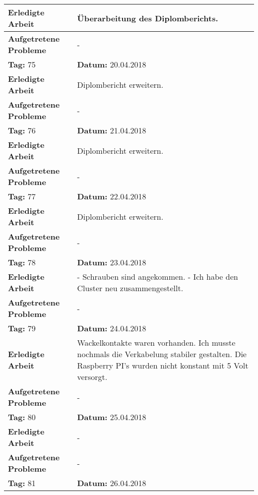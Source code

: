 \begin{longtable}{|p{5cm}|p{5cm}p{6cm}|}
\textbf{Erledigte Arbeit} & \multicolumn{2}{p{11cm}|}{Überarbeitung des Diplomberichts.} \\ \hline
\textbf{Aufgetretene Probleme} & \multicolumn{2}{p{11cm}|}{-} \\ \hline
\rowcolor{heading}\textbf{Tag:} 75 & \textbf{Datum:} 20.04.2018 & \\ \hline
\textbf{Erledigte Arbeit} & \multicolumn{2}{p{11cm}|}{Diplombericht erweitern.} \\ \hline
\textbf{Aufgetretene Probleme} & \multicolumn{2}{p{11cm}|}{-} \\ \hline
\rowcolor{heading}\textbf{Tag:} 76 & \textbf{Datum:} 21.04.2018 & \\ \hline
\textbf{Erledigte Arbeit} & \multicolumn{2}{p{11cm}|}{Diplombericht erweitern.} \\ \hline
\textbf{Aufgetretene Probleme} & \multicolumn{2}{p{11cm}|}{-} \\ \hline
\rowcolor{heading}\textbf{Tag:} 77 & \textbf{Datum:} 22.04.2018 & \\ \hline
\textbf{Erledigte Arbeit} & \multicolumn{2}{p{11cm}|}{Diplombericht erweitern.} \\ \hline
\textbf{Aufgetretene Probleme} & \multicolumn{2}{p{11cm}|}{-} \\ \hline
\rowcolor{heading}\textbf{Tag:} 78 & \textbf{Datum:} 23.04.2018 & \\ \hline
\textbf{Erledigte Arbeit} & \multicolumn{2}{p{11cm}|}{- Schrauben sind angekommen.\newline
- Ich habe den Cluster neu zusammengestellt.} \\ \hline
\textbf{Aufgetretene Probleme} & \multicolumn{2}{p{11cm}|}{-} \\ \hline
\rowcolor{heading}\textbf{Tag:} 79 & \textbf{Datum:} 24.04.2018 & \\ \hline
\textbf{Erledigte Arbeit} & \multicolumn{2}{p{11cm}|}{Wackelkontakte waren vorhanden. Ich musste nochmals die Verkabelung stabiler gestalten. Die Raspberry PI's wurden nicht konstant mit 5 Volt versorgt.} \\ \hline
\textbf{Aufgetretene Probleme} & \multicolumn{2}{p{11cm}|}{-} \\ \hline
\rowcolor{heading}\textbf{Tag:} 80 & \textbf{Datum:} 25.04.2018 & \\ \hline
\textbf{Erledigte Arbeit} & \multicolumn{2}{p{11cm}|}{-} \\ \hline
\textbf{Aufgetretene Probleme} & \multicolumn{2}{p{11cm}|}{-} \\ \hline
\rowcolor{heading}\textbf{Tag:} 81 & \textbf{Datum:} 26.04.2018 & \\ \hline

\end{longtable}
